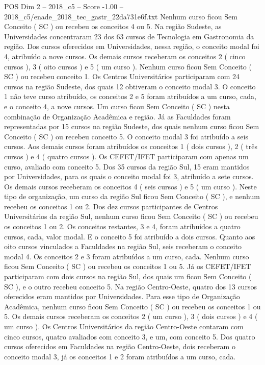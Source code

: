 \begin{textsample}{POS Dim 2 – 2018\_c5 – Score -1.00 – 2018\_c5/enade\_2018\_tec\_gastr\_22da731e6f.txt}
Nenhum curso ficou Sem Conceito ( SC ) ou recebeu os conceitos 4 ou 5.
Na região Sudeste, as Universidades concentraram 23 dos 63 cursos de Tecnologia em Gastronomia da região.
Dos cursos oferecidos em Universidades, nessa região, o conceito modal foi 4, atribuído a nove cursos.
Os demais cursos receberam os conceitos 2 ( cinco cursos ), 3 ( oito cursos ) e 5 ( um curso ).
Nenhum curso ficou Sem Conceito ( SC ) ou recebeu conceito 1.
Os Centros Universitários participaram com 24 cursos na região Sudeste, dos quais 12 obtiveram o conceito modal 3.
O conceito 1 não teve curso atribuído, os conceitos 2 e 5 foram atribuídos a um curso, cada, e o conceito 4, a nove cursos.
Um curso ficou Sem Conceito ( SC ) nesta combinação de Organização Acadêmica e região.
Já as Faculdades foram representadas por 15 cursos na região Sudeste, dos quais nenhum curso ficou Sem Conceito ( SC ) ou recebeu conceito 5.
O conceito modal 3 foi atribuído a seis cursos.
Aos demais cursos foram atribuídos os conceitos 1 ( dois cursos ), 2 ( três cursos ) e 4 ( quatro cursos ).
Os CEFET/IFET participaram com apenas um curso, avaliado com conceito 5.
Dos 35 cursos da região Sul, 15 eram mantidos por Universidades, para os quais o conceito modal foi 3, atribuído a sete cursos.
Os demais cursos receberam os conceitos 4 ( seis cursos ) e 5 ( um curso ).
Neste tipo de organização, um curso da região Sul ficou Sem Conceito ( SC ), e nenhum recebeu os conceitos 1 ou 2.
Dos dez cursos participantes de Centros Universitários da região Sul, nenhum curso ficou Sem Conceito ( SC ) ou recebeu os conceitos 1 ou 2.
Os conceitos restantes, 3 e 4, foram atribuídos a quatro cursos, cada, valor modal.
E o conceito 5 foi atribuído a dois cursos.
Quanto aos oito cursos vinculados a Faculdades na região Sul, seis receberam o conceito modal 4.
Os conceitos 2 e 3 foram atribuídos a um curso, cada.
Nenhum curso ficou Sem Conceito ( SC ) ou recebeu os conceitos 1 ou 5.
Já os CEFET/IFET participaram com dois cursos na região Sul, dos quais um ficou Sem Conceito ( SC ), e o outro recebeu conceito 5.
Na região Centro-Oeste, quatro dos 13 cursos oferecidos eram mantidos por Universidades.
Para esse tipo de Organização Acadêmica, nenhum curso ficou Sem Conceito ( SC ) ou recebeu os conceitos 1 ou 5.
Os demais cursos receberam os conceitos 2 ( um curso ), 3 ( dois cursos ) e 4 ( um curso ).
Os Centros Universitários da região Centro-Oeste contaram com cinco cursos, quatro avaliados com conceito 3, e um, com conceito 5.
Dos quatro cursos oferecidos em Faculdades na região Centro-Oeste, dois receberam o conceito modal 3, já os conceitos 1 e 2 foram atribuídos a um curso, cada.

\end{textsample}
